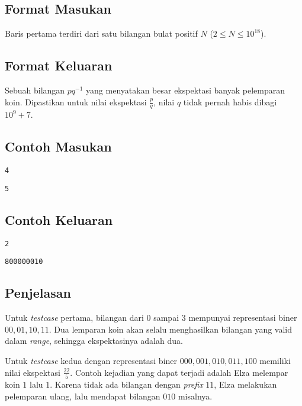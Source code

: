 \documentclass{article}
\begin{document}
\subsection*{Format Masukan}
Baris pertama terdiri dari satu bilangan bulat positif $N$ ($2 \leq N \leq 10^{18}$).

\subsection*{Format Keluaran}
Sebuah bilangan $pq^{-1}$ yang menyatakan besar ekspektasi banyak pelemparan koin. Dipastikan untuk nilai ekspektasi $\frac{p}{q}$, nilai $q$ tidak pernah habis dibagi $10^9+7$.

\begin{multicols}{2}
\subsection*{Contoh Masukan}
\begin{lstlisting}
4
\end{lstlisting}
\begin{lstlisting}
5
\end{lstlisting}
\columnbreak
\subsection*{Contoh Keluaran}
\begin{lstlisting}
2
\end{lstlisting}
\begin{lstlisting}
800000010
\end{lstlisting}
\end{multicols}

\subsection*{Penjelasan}
Untuk \textit{testcase} pertama, bilangan dari $0$ sampai $3$ mempunyai representasi biner $00, 01, 10, 11$. Dua lemparan koin akan selalu menghasilkan bilangan yang valid dalam \textit{range}, sehingga ekspektasinya adalah dua.

Untuk \textit{testcase} kedua dengan representasi biner $000, 001, 010, 011, 100$ memiliki nilai ekspektasi $\frac{22}{5}$. Contoh kejadian yang dapat terjadi adalah Elza melempar koin $1$ lalu $1$. Karena tidak ada bilangan dengan \textit{prefix} $11$, Elza melakukan pelemparan ulang, lalu mendapat bilangan $010$ misalnya. 
\pagebreak
\end{document}
